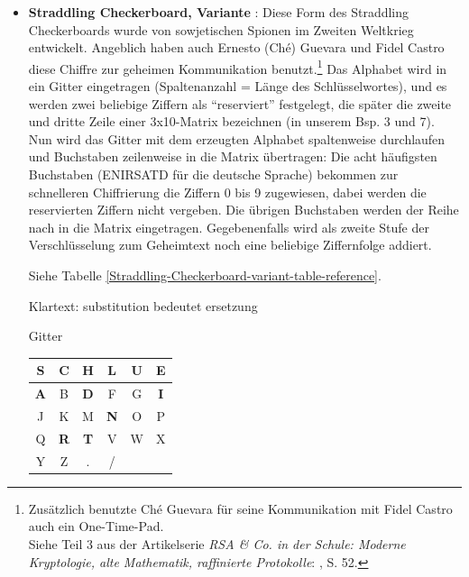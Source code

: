\begin{refsegment}
\begin{itemize}
\item \textbf{Straddling Checkerboard, Variante} \cite{Goebel2014}%
   :
   Diese Form des Straddling Checkerboards wurde von sowjetischen Spionen
   im Zweiten Weltkrieg entwickelt. Angeblich haben auch Ernesto (Ch\'e)
   Guevara und Fidel Castro diese Chiffre zur geheimen
   Kommunikation benutzt.\footnote{%
     Zusätzlich benutzte Ch\'e Guevara für seine Kommunikation mit Fidel Castro
     auch ein One-Time-Pad.\\
     Siehe Teil 3 aus der Artikelserie {\em RSA \& Co. in der Schule:
     Moderne Kryptologie, alte Mathematik, raffinierte Protokolle}:
     \cite{Witten1999}, S. 52.
   }
   Das Alphabet wird in ein Gitter eingetragen (Spaltenanzahl = Länge des
   Schlüsselwortes), und es werden zwei beliebige Ziffern als "`reserviert"'
   festgelegt, die später die zweite und dritte Zeile einer
   3x10-Matrix bezeichnen (in unserem Bsp. 3 und 7). Nun wird das Gitter mit
   dem erzeugten Alphabet spaltenweise durchlaufen und Buchstaben zeilenweise
   in die Matrix übertragen:
   Die acht häufigsten Buchstaben (ENIRSATD für die deutsche Sprache)
   bekommen zur schnelleren Chiffrierung die Ziffern 0 bis 9 zugewiesen,
   dabei werden die reservierten Ziffern nicht vergeben. Die übrigen
   Buchstaben werden der Reihe nach in die Matrix eingetragen.
   Gegebenenfalls wird als zweite Stufe der Verschlüsselung zum Geheimtext
   noch eine beliebige Ziffernfolge addiert.

   Siehe Tabelle \ref{Straddling-Checkerboard-variant-table-reference}.

   Klartext: substitution bedeutet ersetzung

   \begin{table}[ht]

   \begin{center}
   Gitter~~
   \begin{tabular}{|c|c|c|c|c|c|}
   \hline 		
	\textbf{S} & C & H & L & U & \textbf{E}\\
   \hline
	\textbf{A} & B & \textbf{D} & F & G & \textbf{I}\\
   \hline
	J & K & M & \textbf{N} & O & P\\
   \hline
	Q & \textbf{R} & \textbf{T} & V & W & X\\
   \hline
	Y & Z & . & / &   &    \\
   \hline
   \end{tabular}
   \end{center}


\end{table}
\end{itemize}
\end{refsegment}
